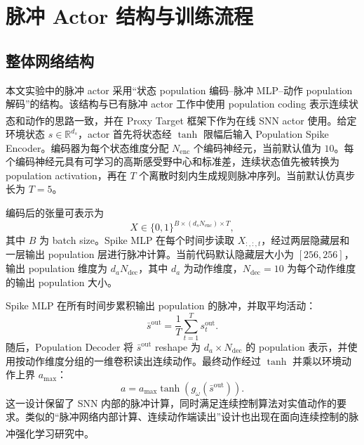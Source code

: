 \documentclass[UTF8,zihao=-4,oneside,openany]{ctexbook}
\let\oldcite\cite
\renewcommand{\cite}[1]{\textsuperscript{\oldcite{#1}}}
\begin{document}
\chapter{脉冲 Actor 结构与训练流程}

\section{整体网络结构}
本文实验中的脉冲 actor 采用“状态 population 编码--脉冲 MLP--动作 population 解码”的结构。该结构与已有脉冲 actor 工作中使用 population coding 表示连续状态和动作的思路一致\cite{tang2020popsan,zhang2022mdc}，并在 Proxy Target 框架下作为在线 SNN actor 使用\cite{xu2025proxy}。给定环境状态 $s\in\mathbb{R}^{d_s}$，actor 首先将状态经 $\tanh$ 限幅后输入 Population Spike Encoder。编码器为每个状态维度分配 $N_{\mathrm{enc}}$ 个编码神经元，当前默认值为 $10$。每个编码神经元具有可学习的高斯感受野中心和标准差，连续状态值先被转换为 population activation，再在 $T$ 个离散时刻内生成规则脉冲序列。当前默认仿真步长为 $T=5$。

编码后的张量可表示为
\begin{equation}
X\in\{0,1\}^{B\times(d_s N_{\mathrm{enc}})\times T},
\end{equation}
其中 $B$ 为 batch size。Spike MLP 在每个时间步读取 $X_{:,:,t}$，经过两层隐藏层和一层输出 population 层进行脉冲计算。当前代码默认隐藏层大小为 $[256,256]$，输出 population 维度为 $d_a N_{\mathrm{dec}}$，其中 $d_a$ 为动作维度，$N_{\mathrm{dec}}=10$ 为每个动作维度的输出 population 大小。

Spike MLP 在所有时间步累积输出 population 的脉冲，并取平均活动：
\begin{equation}
\bar{s}^{\mathrm{out}}
=
\frac{1}{T}\sum_{t=1}^{T}s_t^{\mathrm{out}}.
\end{equation}
随后，Population Decoder 将 $\bar{s}^{\mathrm{out}}$ reshape 为 $d_a\times N_{\mathrm{dec}}$ 的 population 表示，并使用按动作维度分组的一维卷积读出连续动作。最终动作经过 $\tanh$ 并乘以环境动作上界 $a_{\max}$：
\begin{equation}
a=a_{\max}\tanh(g_{\omega}(\bar{s}^{\mathrm{out}})).
\end{equation}
这一设计保留了 SNN 内部的脉冲计算，同时满足连续控制算法对实值动作的要求。类似的“脉冲网络内部计算、连续动作端读出”设计也出现在面向连续控制的脉冲强化学习研究中\cite{tang2020popsan,chen2024fully}。
\end{document}
